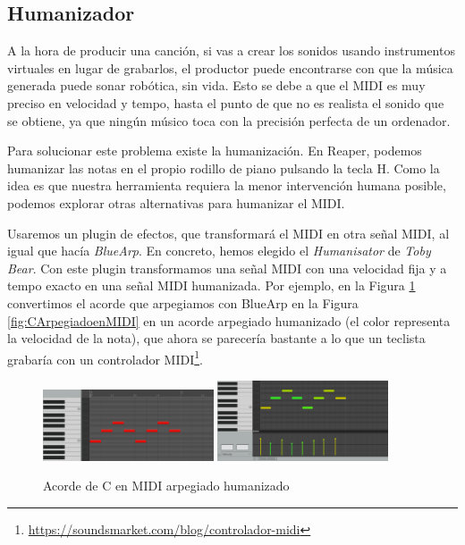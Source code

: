     \subsection{Humanizador}\label{subsubsec:humanizador}
A la hora de producir una canción, si vas a crear los sonidos usando instrumentos virtuales en lugar de grabarlos, el productor puede encontrarse con que la música generada puede sonar robótica, sin vida. Esto se debe a que el MIDI es muy preciso en velocidad y tempo, hasta el punto de que no es realista el sonido que se obtiene, ya que ningún músico toca con la precisión perfecta de un ordenador.

Para solucionar este problema existe la humanización. En Reaper, podemos humanizar las notas en el propio rodillo de piano pulsando la tecla H. Como la idea es que nuestra herramienta requiera la menor intervención humana posible, podemos explorar otras alternativas para humanizar el MIDI.

Usaremos un plugin de efectos, que transformará el MIDI en otra señal MIDI, al igual que hacía \textit{BlueArp}. En concreto, hemos elegido el \textit{Humanisator} de \textit{Toby Bear}. Con este plugin transformamos una señal MIDI con una velocidad fija y a tempo exacto en una señal MIDI humanizada. Por ejemplo, en la Figura \ref{fig:CArpegiadoenMIDIHumanizado} convertimos el acorde que arpegiamos con BlueArp en la Figura \ref{fig:CArpegiadoenMIDI} en un acorde arpegiado humanizado (el color representa la velocidad de la nota), que ahora se parecería bastante a lo que un teclista grabaría con un controlador MIDI\footnote{\url{https://soundsmarket.com/blog/controlador-midi}}.


\begin{figure}[h]
    \centering
    \includegraphics[width = 0.45\textwidth]{Imagenes/Bitmap/DoMayorMidiArpegiado.png}
    \includegraphics[width = 0.45\textwidth]{Imagenes/Bitmap/DoMayorMidiArpegiadoHumanizado.png}
    \caption{Acorde de C en MIDI arpegiado humanizado}
    \label{fig:CArpegiadoenMIDIHumanizado}
\end{figure}

